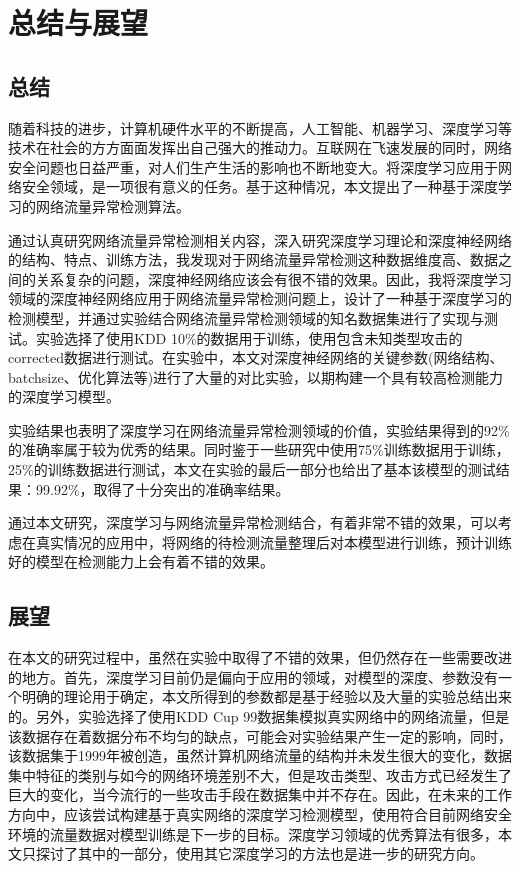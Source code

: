 \chapter{总结与展望}

\section{总结}

随着科技的进步，计算机硬件水平的不断提高，人工智能、机器学习、深度学习等技术在社会的方方面面发挥出自己强大的推动力。互联网在飞速发展的同时，网络安全问题也日益严重，对人们生产生活的影响也不断地变大。将深度学习应用于网络安全领域，是一项很有意义的任务。基于这种情况，本文提出了一种基于深度学习的网络流量异常检测算法。

通过认真研究网络流量异常检测相关内容，深入研究深度学习理论和深度神经网络的结构、特点、训练方法，我发现对于网络流量异常检测这种数据维度高、数据之间的关系复杂的问题，深度神经网络应该会有很不错的效果。因此，我将深度学习领域的深度神经网络应用于网络流量异常检测问题上，设计了一种基于深度学习的检测模型，并通过实验结合网络流量异常检测领域的知名数据集进行了实现与测试。实验选择了使用KDD 10\%的数据用于训练，使用包含未知类型攻击的corrected数据进行测试。在实验中，本文对深度神经网络的关键参数(网络结构、batchsize、优化算法等)进行了大量的对比实验，以期构建一个具有较高检测能力的深度学习模型。

实验结果也表明了深度学习在网络流量异常检测领域的价值，实验结果得到的92\%的准确率属于较为优秀的结果。同时鉴于一些研究中使用75\%训练数据用于训练，25\%的训练数据进行测试，本文在实验的最后一部分也给出了基本该模型的测试结果：99.92\%，取得了十分突出的准确率结果。

通过本文研究，深度学习与网络流量异常检测结合，有着非常不错的效果，可以考虑在真实情况的应用中，将网络的待检测流量整理后对本模型进行训练，预计训练好的模型在检测能力上会有着不错的效果。

\section{展望}

在本文的研究过程中，虽然在实验中取得了不错的效果，但仍然存在一些需要改进的地方。首先，深度学习目前仍是偏向于应用的领域，对模型的深度、参数没有一个明确的理论用于确定，本文所得到的参数都是基于经验以及大量的实验总结出来的。另外，实验选择了使用KDD Cup 99数据集模拟真实网络中的网络流量，但是该数据存在着数据分布不均匀的缺点，可能会对实验结果产生一定的影响，同时，该数据集于1999年被创造，虽然计算机网络流量的结构并未发生很大的变化，数据集中特征的类别与如今的网络环境差别不大，但是攻击类型、攻击方式已经发生了巨大的变化，当今流行的一些攻击手段在数据集中并不存在。因此，在未来的工作方向中，应该尝试构建基于真实网络的深度学习检测模型，使用符合目前网络安全环境的流量数据对模型训练是下一步的目标。深度学习领域的优秀算法有很多，本文只探讨了其中的一部分，使用其它深度学习的方法也是进一步的研究方向。